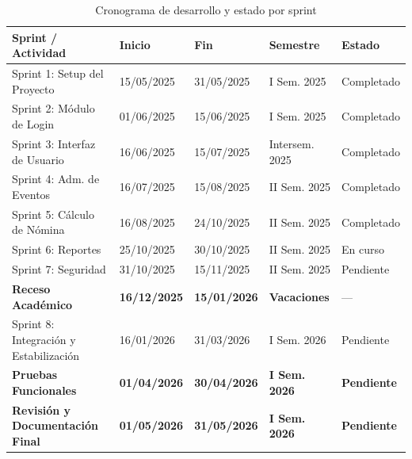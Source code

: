 \begin{table}[h!]
	\centering
	\renewcommand{\arraystretch}{1.15}
	\setlength{\tabcolsep}{3pt} %
	\begin{tabular}{|p{4.2cm}|p{2cm}|p{2cm}|p{2.8cm}|p{1.8cm}|}
		\hline
		\textbf{Sprint / Actividad}             & \textbf{Inicio}     & \textbf{Fin}        & \textbf{Semestre}    & \textbf{Estado}    \\ \hline
		Sprint 1: Setup del Proyecto            & 15/05/2025          & 31/05/2025          & I Sem. 2025          & Completado         \\ \hline
		Sprint 2: Módulo de Login               & 01/06/2025          & 15/06/2025          & I Sem. 2025          & Completado         \\ \hline
		Sprint 3: Interfaz de Usuario           & 16/06/2025          & 15/07/2025          & Intersem. 2025       & Completado         \\ \hline
		Sprint 4: Adm. de Eventos               & 16/07/2025          & 15/08/2025          & II Sem. 2025         & Completado         \\ \hline
		Sprint 5: Cálculo de Nómina             & 16/08/2025          & 24/10/2025          & II Sem. 2025         & Completado         \\ \hline
		Sprint 6: Reportes                      & 25/10/2025          & 30/10/2025          & II Sem. 2025         & En curso           \\ \hline
		Sprint 7: Seguridad                     & 31/10/2025          & 15/11/2025          & II Sem. 2025         & Pendiente          \\ \hline
		\rowcolor{gray!10}
		\textbf{Receso Académico}               & \textbf{16/12/2025} & \textbf{15/01/2026} & \textbf{Vacaciones}  & ---                \\ \hline
		Sprint 8: Integración y Estabilización  & 16/01/2026          & 31/03/2026          & I Sem. 2026          & Pendiente          \\ \hline
		\rowcolor{gray!10}
		\textbf{Pruebas Funcionales}            & \textbf{01/04/2026} & \textbf{30/04/2026} & \textbf{I Sem. 2026} & \textbf{Pendiente} \\ \hline
		\rowcolor{gray!10}
		\textbf{Revisión y Documentación Final} & \textbf{01/05/2026} & \textbf{31/05/2026} & \textbf{I Sem. 2026} & \textbf{Pendiente} \\ \hline
	\end{tabular}
	\caption{Cronograma de desarrollo y estado por sprint}
	\label{tab:cronograma_vp}
\end{table}



